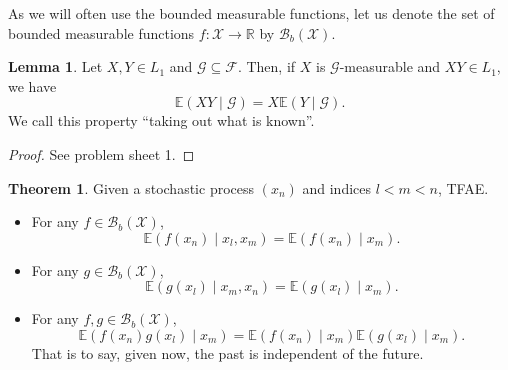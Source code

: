 \documentclass[]{article}
\theoremstyle{definition}
\newtheorem{theorem}{Theorem}
\theoremstyle{definition}
\newtheorem{lemma}{Lemma}[section]
\begin{document}
As we will often use the bounded measurable functions, let us denote the set 
of bounded measurable functions \(f : \mathcal{X} \to \mathbb{R}\) by 
\(\mathcal{B}_b(\mathcal{X})\).

\begin{lemma}
  Let \(X, Y \in L_1\) and \(\mathcal{G} \subseteq \mathcal{F}\). Then, if \(X\) 
  is \(\mathcal{G}\)-measurable and \(XY \in L_1\), we have
  \[\mathbb{E}(XY \mid \mathcal{G}) = X\mathbb{E}(Y \mid \mathcal{G}).\]
  We call this property ``taking out what is known''.
\end{lemma}
\begin{proof}
  See problem sheet 1.
\end{proof}

\begin{theorem}
  Given a stochastic process \((x_n)\) and indices \(l < m < n\), TFAE.
  \begin{itemize}
    \item For any \(f \in \mathcal{B}_b(\mathcal{X})\), 
      \[\mathbb{E}(f(x_n) \mid x_l, x_m) = \mathbb{E}(f(x_n) \mid x_m).\]
    \item For any \(g \in \mathcal{B}_b(\mathcal{X})\), 
      \[\mathbb{E}(g(x_l) \mid x_m, x_n) = \mathbb{E}(g(x_l) \mid x_m).\]
    \item For any \(f, g \in \mathcal{B}_b(\mathcal{X})\), 
      \[\mathbb{E}(f(x_n)g(x_l) \mid x_m) = \mathbb{E}(f(x_n) \mid x_m) \mathbb{E}(g(x_l) \mid x_m).\]
      That is to say, given now, the past is independent of the future.
  \end{itemize}
\end{theorem}
\end{document}

